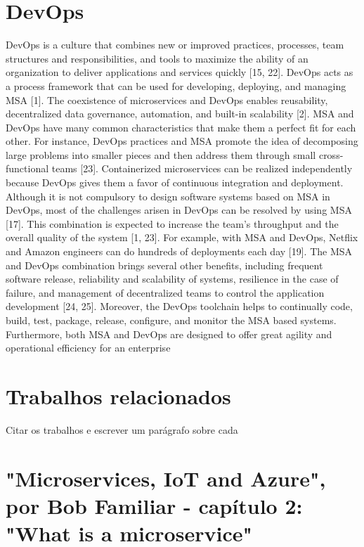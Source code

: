 \section{DevOps}
\label{devops}

DevOps is a culture that combines new or improved practices, processes, team structures and responsibilities, and tools to maximize the ability of an organization to deliver applications and services quickly [15, 22]. DevOps acts as a process framework that can be used for developing, deploying, and managing MSA [1]. The coexistence of microservices and DevOps enables reusability, decentralized data governance, automation, and built-in scalability [2]. MSA and DevOps have many common characteristics that make them a perfect fit for each other. For instance, DevOps practices and MSA promote the idea of decomposing large problems into smaller pieces and then address them through small cross-functional teams [23]. Containerized microservices can be realized independently because DevOps gives them a favor of continuous integration and deployment. Although it is not compulsory to design software systems based on MSA in DevOps, most of the challenges arisen in DevOps can be resolved by using MSA [17]. This combination is expected to increase the team’s throughput and the overall quality of the system [1, 23]. For example, with MSA and DevOps, Netflix and Amazon engineers can do hundreds of deployments each day [19]. The MSA and DevOps combination brings several other benefits, including frequent software release, reliability and scalability of systems, resilience in the case of failure, and management of decentralized teams to control the application development [24, 25]. Moreover, the DevOps toolchain helps to continually code, build, test, package, release, configure, and monitor the MSA based systems. Furthermore, both MSA and DevOps are designed to offer great agility and operational efficiency for an enterprise

\section{Trabalhos relacionados}

Citar os trabalhos e escrever um parágrafo sobre cada

\section*{"Microservices, IoT and Azure", por Bob Familiar - capítulo 2: "What is a microservice"}

